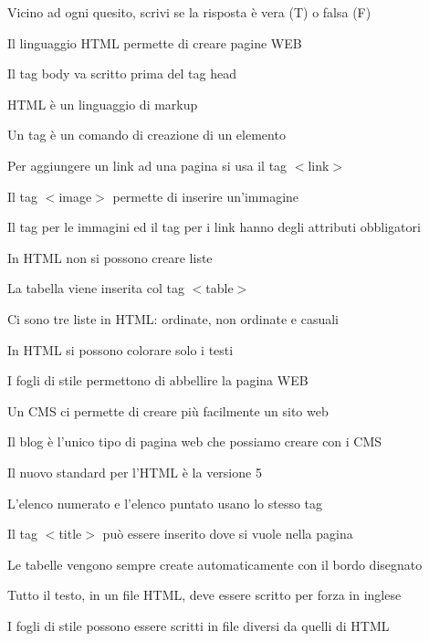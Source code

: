 \documentclass[addpoints]{exam}
\newcommand{\tf}[1][{}]{%
	\fillin[#1][0.25in]%
}
\begin{document}
 
\begin{center}
\end{center} 
 
\vspace{5mm}
 
 
\vspace{5mm}
 
Vicino ad ogni quesito, scrivi se la risposta è vera (T) o falsa (F)
\begin{multicols}{2}
\begin{questions}


\question \tf[T] Il linguaggio HTML permette di creare pagine WEB

\question \tf[F] Il tag body va scritto prima del tag head

\question \tf[T] HTML è un linguaggio di markup

\question \tf[T] Un tag è un comando di creazione di un elemento

\question \tf[F] Per aggiungere un link ad una pagina si usa il tag $<$link$>$

\question \tf[T] Il tag $<$image$>$ permette di inserire un'immagine

\question \tf[T] Il tag per le immagini ed il tag per i link hanno degli attributi obbligatori

\question \tf[F] In HTML non si possono creare liste

\question \tf[T] La tabella viene inserita col tag $<$table$>$

\question \tf[F] Ci sono tre liste in HTML: ordinate, non ordinate e casuali

\question \tf[F] In HTML si possono colorare solo i testi

\question \tf[T] I fogli di stile permettono di abbellire la pagina WEB

\question \tf[T] Un CMS ci permette di creare più facilmente un sito web

\question \tf[F] Il blog è l'unico tipo di pagina web che possiamo creare con i CMS

\question \tf[T] Il nuovo standard per l'HTML è la versione 5

\question \tf[F] L'elenco numerato e l'elenco puntato usano lo stesso tag

\question \tf[T] Il tag $<$title$>$ può essere inserito dove si vuole nella pagina 

\question \tf[F] Le tabelle vengono sempre create automaticamente con il bordo disegnato

\question \tf[F] Tutto il testo, in un file HTML, deve essere scritto per forza in inglese

\question \tf[T] I fogli di stile possono essere scritti in file diversi da quelli di HTML


\end{questions}
\end{multicols}
\end{document}
